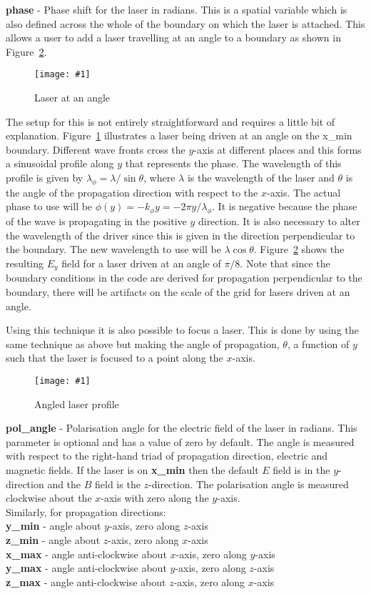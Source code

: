 \documentclass[12pt,a4paper]{article}
\newcommand{\emphtext}{\color{warwickdark} \fontfamily{phv}\selectfont\large\bf}
\newcommand{\inlineemph}[1]{{\color{warwicklight} \bf{#1}}}
\newcommand{\scaledcapimage}[4]
  {{\begin{figure}[hbt!]\centering\texttt{[image: \#1]}\caption{#3}
    \label{#2} \end{figure}}}
\begin{document}
{\emphtext phase} - Phase shift for the laser in radians. This is a spatial
variable which is also defined across the whole of the boundary on which the
laser is attached. This allows a user to add a laser travelling at an angle
to a boundary as shown in Figure~\ref{angle}.
\scaledcapimage{./images/wave}{wave}{Laser at an angle}{0.4}
The setup for this is not entirely straightforward and requires a little
bit of explanation. Figure~\ref{wave} illustrates a laser being driven at
an angle on the x\_min boundary. Different wave fronts cross the $y$-axis
at different places and this forms a sinusoidal profile along $y$ that
represents the phase. The wavelength of this profile is
given by $\lambda_\phi = \lambda / \sin\theta$, where $\lambda$ is the
wavelength of the laser and $\theta$ is the angle of the propagation
direction with respect to the $x$-axis. The actual phase to use will
be $\phi(y) = -k_\phi y = -2\pi y / \lambda_\phi$. It is negative because
the phase of the wave is propagating in the positive $y$ direction.
It is also necessary to alter the wavelength of the driver since this
is given in the direction perpendicular to the boundary. The new
wavelength to use will be $\lambda\cos\theta$. Figure~\ref{angle} shows
the resulting $E_y$ field for a laser driven at an angle of $\pi / 8$. Note
that since the boundary conditions in the code are derived for propagation
perpendicular to the boundary, there will be artifacts on the scale of the
grid for lasers driven at an angle.

Using this technique it is also possible to focus a laser. This is done by
using the same technique as above but making the angle of propagation,
$\theta$, a function of $y$ such that the laser is focused to a point along
the $x$-axis.\\

\scaledcapimage{./images/profile_angle}{angle}{Angled laser profile}{0.4}


{\emphtext pol\_angle} - Polarisation angle for the electric field of the
laser in radians. This parameter is optional and has a value of zero by default.
The angle is measured with respect to the right-hand triad of propagation
direction, electric and magnetic fields. If the laser is on
\inlineemph{x\_min} then the default $E$ field is in the $y$-direction and
the $B$ field is the $z$-direction. The polarisation angle is measured
clockwise about the $x$-axis with zero along the $y$-axis.\\
Similarly, for propagation directions:\\
\inlineemph{y\_min} - angle about $y$-axis, zero along $z$-axis\\
\inlineemph{z\_min} - angle about $z$-axis, zero along $x$-axis\\
\inlineemph{x\_max} - angle anti-clockwise about $x$-axis, zero along $y$-axis\\
\inlineemph{y\_max} - angle anti-clockwise about $y$-axis, zero along $z$-axis\\
\inlineemph{z\_max} - angle anti-clockwise about $z$-axis, zero along $x$-axis\\
\end{document}

